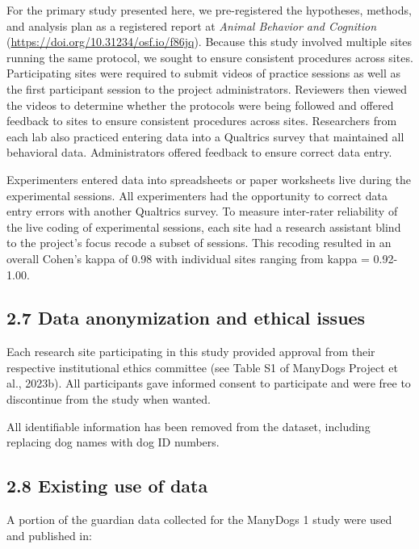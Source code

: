 \documentclass[
  pub,floatsintext]{apa6}
\begin{document}
For the primary study presented here, we pre-registered the hypotheses, methods, and analysis plan as a registered report at \emph{Animal Behavior and Cognition} (\url{https://doi.org/10.31234/osf.io/f86jq}). Because this study involved multiple sites running the same protocol, we sought to ensure consistent procedures across sites. Participating sites were required to submit videos of practice sessions as well as the first participant session to the project administrators. Reviewers then viewed the videos to determine whether the protocols were being followed and offered feedback to sites to ensure consistent procedures across sites. Researchers from each lab also practiced entering data into a Qualtrics survey that maintained all behavioral data. Administrators offered feedback to ensure correct data entry.

Experimenters entered data into spreadsheets or paper worksheets live during the experimental sessions. All experimenters had the opportunity to correct data entry errors with another Qualtrics survey. To measure inter-rater reliability of the live coding of experimental sessions, each site had a research assistant blind to the project's focus recode a subset of sessions. This recoding resulted in an overall Cohen's kappa of 0.98 with individual sites ranging from kappa = 0.92-1.00.

\hypertarget{data-anonymization-and-ethical-issues}{%
\subsection{2.7 Data anonymization and ethical issues}\label{data-anonymization-and-ethical-issues}}

Each research site participating in this study provided approval from their respective institutional ethics committee (see Table S1 of ManyDogs Project et al., 2023b). All participants gave informed consent to participate and were free to discontinue from the study when wanted.

All identifiable information has been removed from the dataset, including replacing dog names with dog ID numbers.

\hypertarget{existing-use-of-data}{%
\subsection{2.8 Existing use of data}\label{existing-use-of-data}}

A portion of the guardian data collected for the ManyDogs 1 study were used and published in:
\end{document}

